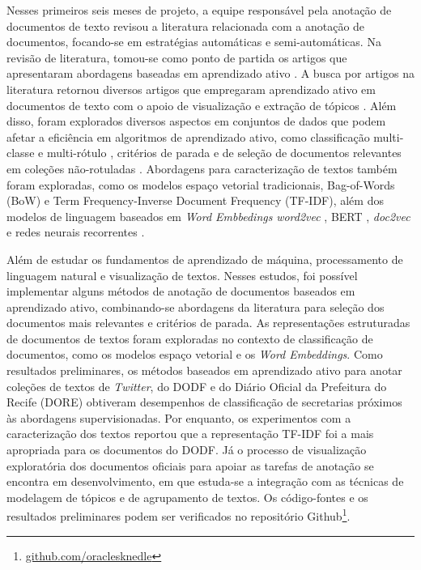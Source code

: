 \documentclass[12pt]{article}
\begin{document}
Nesses primeiros seis meses de projeto, a equipe responsável pela anotação de documentos de texto revisou a literatura relacionada com a anotação de documentos, focando-se em estratégias automáticas e semi-automáticas. Na revisão de literatura, tomou-se como ponto de partida os artigos que apresentaram abordagens baseadas em aprendizado ativo \cite{settles_activeLearning_Survey_2009}. A busca por artigos na literatura retornou diversos artigos que empregaram aprendizado ativo em documentos de texto com o apoio de visualização \cite{lulu_etal_alVisualization_acm_wesida_2017,makki_etl_atrVis_acmTran_KDD,hamid_etal_acmtransiis_2018} e extração de tópicos \cite{balasubramanyan_etal_mlInkdd_2013,tuarob_etal_docanotTopicMod_ijdl_2015}. Além disso, foram explorados diversos aspectos em conjuntos de dados que podem afetar a eficiência em algoritmos de aprendizado ativo, como classificação multi-classe \cite{joshi_etal_multiclassAL_cvpr_2009} e multi-rótulo \cite{bishan_etal_multilabelAL_sigkdd_2009}, critérios de parada \cite{jingbo_etal_stopCritAL_acmtranslp_2010} e de seleção de documentos relevantes em coleções não-rotuladas \cite{bouneffouf_expoGradAl_computers_2016}. Abordagens para caracterização de textos também foram exploradas, como os modelos espaço vetorial tradicionais, Bag-of-Words (BoW) e Term Frequency-Inverse Document Frequency (TF-IDF), além dos modelos de linguagem baseados em \textit{Word Embbedings} \textit{word2vec} \cite{mikolov_etal_word2vec_2013}, BERT \cite{devlin_etal_bert_2019}, \textit{doc2vec} \cite{mikolov_etal_doc2vec_2014} e redes neurais recorrentes \cite{attention_vaswani_etal_2017}.

Além de estudar os fundamentos de aprendizado de máquina, processamento de linguagem natural e visualização de textos. Nesses estudos, foi possível implementar alguns métodos de anotação de documentos baseados em aprendizado ativo, combinando-se abordagens da literatura para seleção dos documentos mais relevantes e critérios de parada. As representações estruturadas de documentos de textos foram exploradas no contexto de classificação de documentos, como os modelos espaço vetorial e os \textit{Word Embeddings}. Como resultados preliminares, os métodos baseados em aprendizado ativo para anotar coleções de textos de \textit{Twitter}, do DODF e do Diário Oficial da Prefeitura do Recife (DORE) obtiveram desempenhos de classificação de secretarias próximos às abordagens supervisionadas. Por enquanto, os experimentos com a caracterização dos textos reportou que a representação TF-IDF foi a mais apropriada para os documentos do DODF. Já o processo de visualização exploratória dos documentos oficiais para apoiar as tarefas de anotação se encontra em desenvolvimento, em que estuda-se a integração com as técnicas de modelagem de tópicos e de agrupamento de textos. Os código-fontes e os resultados preliminares podem ser verificados no repositório Github\footnote{\url{github.com/oraclesknedle}}.
\end{document}
